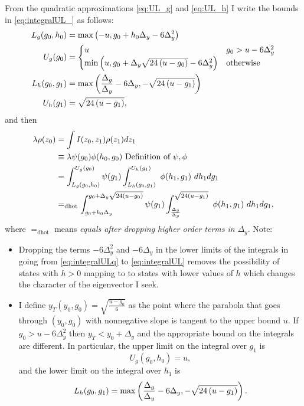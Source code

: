 \documentclass[]{article}
\newcommand{\dhot}{=_{\text{dhot}}}
\begin{document}
From the quadratic approximations \eqref{eq:UL_g} and \eqref{eq:UL_h}
I write the bounds in \eqref{eq:integralUL_} as follows:
\begin{align*}
  L_g(g_0, h_0) &= \max \left( -u, g_0 + h_0 \Delta_y - 6 \Delta_y^2
  \right)\\
  U_g(g_0) &=
  \begin{cases}
    u & g_0 > u - 6 \Delta_y^2 \\
    \min \left( u, g_0 + \Delta_y\sqrt{24\left(u-g_0\right)} - 6 \Delta_y^2
    \right) & \text{otherwise}
  \end{cases} \\
  L_h(g_0, g_1) &= \max \left( \frac{\Delta_g}{\Delta_y} - 6
    \Delta_y, - \sqrt{24\left(u-g_1\right)} \right) \\
  U_h(g_1) &= \sqrt{24\left(u-g_1\right)} ,
\end{align*}
and then
\newcommand{\Ug}{ g_0 + \Delta_y\Rad{-g_0}}
\newcommand{\Lg}{g_0 + h_0\Delta_y}
\newcommand{\Lh}{\frac{\Delta_g}{\Delta_y}}
\begin{align}
  \lambda \rho(z_0) &= \int I(z_0, z_1) \rho(z_1) d
  z_1 \nonumber \\
  &\equiv \lambda \psi(g_0) \phi(h_0,g_0) \text{ Definition of } \psi,
  \phi \nonumber \\
  \label{eq:integralULq}
    &= \int_{L_g(g_0, h_0)}^{U_g(g_0)} \psi(g_1)
    \int_{L_h(g_0,g_1)}^{U_h(g_1)}~ \phi(h_1,g_1) ~dh_1 dg_1 \\
  \label{eq:integralUL}
    &\dhot \int_{\Lg}^{\Ug} \psi(g_1) \int_{\Lh}^{\Uh}~ \phi(h_1,g_1) ~dh_1 dg_1,
\end{align}
where $\dhot$ means \emph{equals after dropping higher order terms in}
$\Delta_y$.  Note:
\begin{itemize}
\item Dropping the terms $-6\Delta_y^2$ and $-6 \Delta_y$ in the lower
   limits of the integrals in going from \eqref{eq:integralULq} to
   \eqref{eq:integralUL} removes the possibility of states with $h>0$
   mapping to to states with lower values of $h$ which changes the
   character of the eigenvector I seek.
 \item I define $y_T(y_0,g_0) = \sqrt{\frac{u - g_0}{6}}$ as the point
   where the parabola that goes through $(y_0,g_0)$ with nonnegative
   slope is tangent to the upper bound $u$.  If $g_0 > u -
   6\Delta_y^2$ then $y_T < y_0 + \Delta_y$ and the appropriate bound on the
   integrals are different.  In particular, the upper limit on the
   integral over $g_1$ is
   \begin{equation*}
     U_g(g_0,h_0) = u,
   \end{equation*}
   and the lower limit on the integral over $h_1$ is
   \begin{equation*}
     L_h(g_0, g_1) = \max \left( \frac{\Delta_g}{\Delta_y} - 6
       \Delta_y, - \sqrt{24\left(u-g_1\right)} \right).
   \end{equation*}
\end{itemize}
\end{document}
